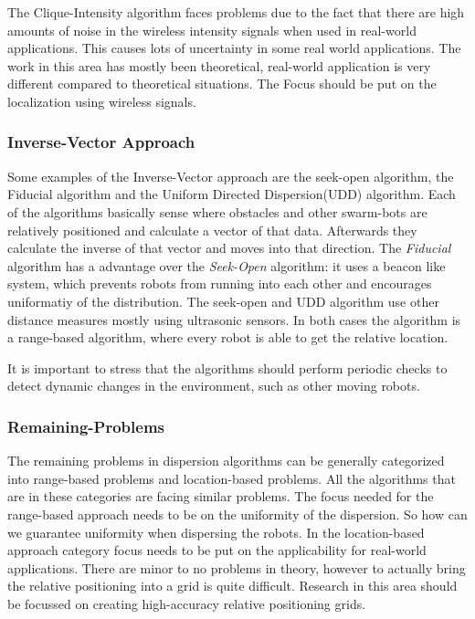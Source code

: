 The Clique-Intensity algorithm faces problems due to the fact that there are high amounts of noise in the wireless intensity signals when used in real-world applications. 
This causes lots of uncertainty in some real world applications.
The work in this area has mostly been theoretical, real-world application is very different compared to theoretical situations.
The Focus should be put on the localization using wireless signals.\\

\subsubsection{Inverse-Vector Approach}
Some examples of the Inverse-Vector approach are the seek-open algorithm\cite{morlok2007dispersing}, the Fiducial algorithm\cite{morlok2007dispersing} and the Uniform Directed Dispersion(UDD) algorithm\cite{mclurkin2007distributed}.
Each of the algorithms basically sense where obstacles and other swarm-bots are relatively positioned and calculate a vector of that data. Afterwards they calculate the inverse of that vector and moves into that direction.
The \emph{Fiducial} algorithm has a advantage over the \emph{Seek-Open} algorithm: it uses a beacon like system, which prevents robots from running into each other and encourages uniformatiy of the distribution.
The seek-open and UDD algorithm use other distance measures mostly using ultrasonic sensors. In both cases the algorithm is a range-based algorithm, where every robot is able to get the relative location. 

It is important to stress that the algorithms should perform periodic checks to detect dynamic changes in the environment, such as other moving robots.


\subsubsection{Remaining-Problems}
The remaining problems in dispersion algorithms can be generally categorized into range-based problems and location-based problems.
All the algorithms that are in these categories are facing similar problems.
The focus needed for the range-based approach needs to be on the uniformity of the dispersion. So how can we guarantee uniformity when dispersing the robots.
In the location-based approach category focus needs to be put on the applicability for real-world applications.
There are minor to no problems in theory, however to actually bring the relative positioning into a grid is quite difficult.
Research in this area should be focussed on creating high-accuracy relative positioning grids.
